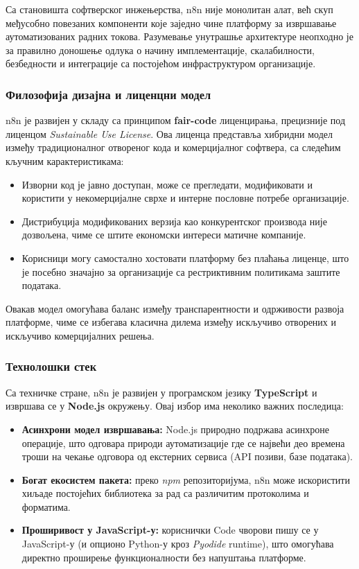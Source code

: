Са становишта софтверског инжењерства, n8n није монолитан алат,
већ скуп међусобно повезаних компоненти које заједно чине
платформу за извршавање аутоматизованих радних токова. Разумевање
унутрашње архитектуре неопходно је за правилно доношење одлука
о начину имплементације, скалабилности, безбедности и интеграције
са постојећом инфраструктуром организације.

\subsubsection{Филозофија дизајна и лиценцни модел}

n8n је развијен у складу са принципом \textbf{fair-code} лиценцирања,
прецизније под лиценцом \textit{Sustainable Use License}. Ова лиценца
представља хибридни модел између традиционалног отвореног кода и
комерцијалног софтвера, са следећим кључним карактеристикама:

\begin{itemize}
    \item Изворни код је јавно доступан, може се прегледати,
    модификовати и користити у некомерцијалне сврхе и интерне
    пословне потребе организације.
    \item Дистрибуција модификованих верзија као конкурентског
    производа није дозвољена, чиме се штите економски интереси
    матичне компаније.
    \item Корисници могу самостално хостовати платформу без плаћања
    лиценце, што је посебно значајно за организације са рестриктивним
    политикама заштите података.
\end{itemize}

Овакав модел омогућава баланс између транспарентности и одрживости
развоја платформе, чиме се избегава класична дилема између
искључиво отворених и искључиво комерцијалних решења.

\subsubsection{Технолошки стек}

Са техничке стране, n8n је развијен у програмском језику
\textbf{TypeScript} и извршава се у \textbf{Node.js} окружењу.
Овај избор има неколико важних последица:

\begin{itemize}
    \item \textbf{Асинхрони модел извршавања:} Node.js природно
    подржава асинхроне операције, што одговара природи аутоматизације
    где се највећи део времена троши на чекање одговора од екстерних
    сервиса (API позиви, базе података).
    \item \textbf{Богат екосистем пакета:} преко \textit{npm} репозиторијума,
    n8n може искористити хиљаде постојећих библиотека за рад са различитим
    протоколима и форматима.
    \item \textbf{Проширивост у JavaScript-у:} кориснички Code чворови
    пишу се у JavaScript-у (и опционо Python-у кроз \textit{Pyodide}
    runtime), што омогућава директно проширење функционалности без
    напуштања платформе.
\end{itemize}

